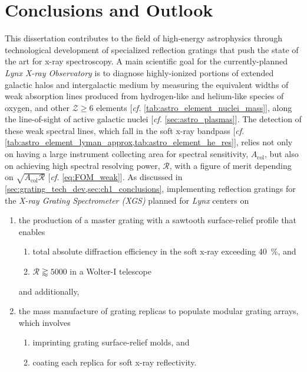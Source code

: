\chapter{Conclusions and Outlook}\label{ch:conclusions}
This dissertation contributes to the field of high-energy astrophysics through technological development of specialized reflection gratings that push the state of the art for x-ray spectroscopy. 
A main scientific goal for the currently-planned \emph{Lynx X-ray Observatory} \cite{Gaskin19} is to diagnose highly-ionized portions of extended galactic halos and intergalactic medium by measuring the equivalent widths of weak absorption lines produced from hydrogen-like and helium-like species of oxygen, and other $\mathcal{Z} \geq 6$ elements [\emph{cf.\@} \cref{tab:astro_element_nuclei_mass}], along the line-of-sight of active galactic nuclei [\emph{cf.\@} \cref{sec:astro_plasmas}].  
The detection of these weak spectral lines, which fall in the soft x-ray bandpass [\emph{cf.\@} \cref{tab:astro_element_lyman_approx,tab:astro_element_he_res}], relies not only on having a large instrument collecting area for spectral sensitivity, $A_{\text{col}}$, but also on achieving high spectral resolving power, $\mathscr{R}$, with a figure of merit depending on $\sqrt{A_{\text{col}} \mathscr{R}}$ [\emph{cf.\@} \cref{eq:FOM_weak}]. 
As discussed in \cref{sec:grating_tech_dev,sec:ch1_conclusions}, implementing reflection gratings for the \emph{X-ray Grating Spectrometer (XGS)} planned for \emph{Lynx} \cite{McEntaffer19} centers on
\begin{enumerate}[noitemsep]
	\item the production of a master grating with a sawtooth surface-relief profile that enables 
	\begin{enumerate}[noitemsep]
    	\item total absolute diffraction efficiency in the soft x-ray exceeding \SI{40}{\percent}, and 
        \item $\mathscr{R} \gtrapprox 5000$ in a Wolter-I telescope
    \end{enumerate}
	and additionally,  
	\item the mass manufacture of grating replicas to populate modular grating arrays, which involves 
	\begin{enumerate}[noitemsep]
    	\item imprinting grating surface-relief molds, and 
        \item coating each replica for soft x-ray reflectivity.  
    \end{enumerate}
\end{enumerate}
